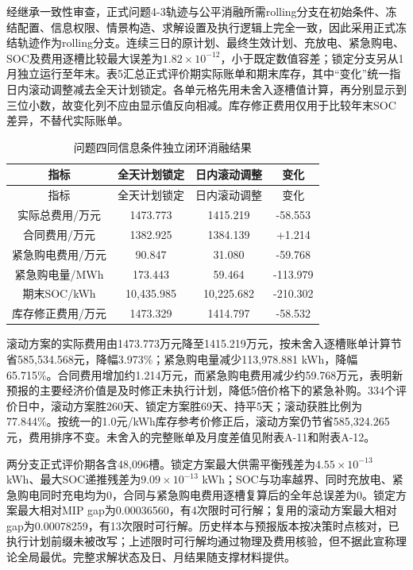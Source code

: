 \documentclass[zihao=-4,a4paper,UTF8,fontset=none]{ctexart}
\begin{document}
经继承一致性审查，正式问题4-3轨迹与公平消融所需rolling分支在初始条件、冻结配置、信息权限、情景构造、求解设置及执行逻辑上完全一致，因此采用正式冻结轨迹作为rolling分支。连续三日的原计划、最终生效计划、充放电、紧急购电、SOC及费用逐槽比较最大误差为\(1.82\times10^{-12}\)，小于既定数值容差；锁定分支另从1月独立运行至年末。表5汇总正式评价期实际账单和期末库存，其中``变化''统一指日内滚动调整减去全天计划锁定。各单元格先用未舍入逐槽值计算，再分别显示到三位小数，故变化列不应由显示值反向相减。库存修正费用仅用于比较年末SOC差异，不替代实际账单。

\begin{longtable}[]{@{}cccc@{}}
\caption{问题四同信息条件独立闭环消融结果}\label{tab:paper-5}\tabularnewline
\toprule\noalign{}
指标 & 全天计划锁定 & 日内滚动调整 & 变化 \\
\midrule\noalign{}
\endfirsthead
\toprule\noalign{}
指标 & 全天计划锁定 & 日内滚动调整 & 变化 \\
\midrule\noalign{}
\endhead
\bottomrule\noalign{}
\endlastfoot
实际总费用/万元 & 1473.773 & 1415.219 & -58.553 \\
合同费用/万元 & 1382.925 & 1384.139 & +1.214 \\
紧急购电费用/万元 & 90.847 & 31.080 & -59.768 \\
紧急购电量/MWh & 173.443 & 59.464 & -113.979 \\
期末SOC/kWh & 10,435.985 & 10,225.682 & -210.302 \\
库存修正费用/万元 & 1473.329 & 1414.797 & -58.532 \\
\end{longtable}

滚动方案的实际费用由1473.773万元降至1415.219万元，按未舍入逐槽账单计算节省585,534.568元，降幅3.973\%；紧急购电量减少113,978.881 kWh，降幅65.715\%。合同费用增加约1.214万元，而紧急购电费用减少约59.768万元，表明新预报的主要经济价值是及时修正未执行计划，降低5倍价格下的紧急补购。334个评价日中，滚动方案胜260天、锁定方案胜69天、持平5天；滚动获胜比例为77.844\%。按统一的1.0元/kWh库存参考价修正后，滚动方案仍节省585,324.265元，费用排序不变。未舍入的完整账单及月度差值见附表A-11和附表A-12。

两分支正式评价期各含48,096槽。锁定方案最大供需平衡残差为\(4.55\times10^{-13}\) kWh、最大SOC递推残差为\(9.09\times10^{-13}\) kWh；SOC与功率越界、同时充放电、紧急购电同时充电均为0，合同与紧急购电费用逐槽复算后的全年总误差为0。锁定方案最大相对MIP gap为0.00036560，有4次限时可行解；复用的滚动方案最大相对gap为0.00078259，有13次限时可行解。历史样本与预报版本按决策时点核对，已执行计划前缀未被改写；上述限时可行解均通过物理及费用核验，但不据此宣称理论全局最优。完整求解状态及日、月结果随支撑材料提供。
\end{document}
